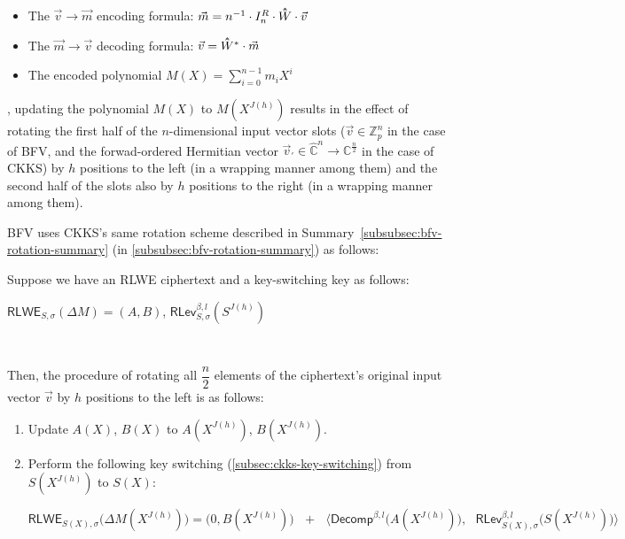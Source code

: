 \begin{itemize}
    \item The $\vec{v} \rightarrow \vec{m}$ encoding formula: $\vec{m} = n^{-1}\cdot I_n^R\cdot \hathat{W}\cdot \vec{v}$
    \item The $\vec{m} \rightarrow \vec{v}$ decoding formula: $\vec{v} = \hathat{W}^* \cdot \vec{m}$
    \item The encoded polynomial $M(X) = \sum\limits_{i=0}^{n-1}m_iX^i$
\end{itemize}    

, updating the polynomial $M(X)$ to $M(X^{J(h)})$ results in the effect of rotating the first half of the $n$-dimensional input vector slots ($\vec{v} \in \mathbb{Z}^n_p$ in the case of BFV, and the forwad-ordered Hermitian vector $\vec{v}_{'} \in \mathbb{\hat C}^{n} \rightarrow \mathbb{C}^{\frac{n}{2}}$ in the case of CKKS) by $h$ positions to the left (in a wrapping manner among them) and the second half of the slots also by $h$ positions to the right (in a wrapping manner among them). 

BFV uses CKKS's same rotation scheme described in Summary~\ref*{subsubsec:bfv-rotation-summary} (in \autoref{subsubsec:bfv-rotation-summary}) as follows: 


\begin{tcolorbox}[title={\textbf{\tboxlabel{\ref*{subsec:ckks-rotation}} CKKS's Homomorphic Rotation of Input Vector Slots}}]



Suppose we have an RLWE ciphertext and a key-switching key as follows:

$\textsf{RLWE}_{S, \sigma}(\Delta M) = (A, B)$, \text{ } $\textsf{RLev}_{S, \sigma}^{\beta, l}(S^{J(h)})$

$ $

Then, the procedure of rotating all $\dfrac{n}{2}$ elements of the ciphertext's original input vector $\vec{v}$ by $h$ positions to the left is as follows: 

\begin{enumerate}
\item Update $A(X)$, $B(X)$ to $A(X^{J(h)})$, $B(X^{J(h)})$. 
\item Perform the following key switching (\autoref{subsec:ckks-key-switching}) from $S(X^{J(h)})$ to $S(X)$:


$\textsf{RLWE}_{S(X),\sigma}\bm{(}\Delta M(X^{J(h)})\bm{)} = \bm{(} 0, B(X^{J(h)}) \bm{)} \text{ } + \text{ } \bm{\langle}  \textsf{Decomp}^{\beta, l}\bm{(}A(X^{J(h)})\bm{)}, \text{ } \textsf{RLev}_{S(X), \sigma}^{\beta, l}\bm{(}S(X^{J(h)})\bm{)} \bm{\rangle}$
\end{enumerate}

\end{tcolorbox}

